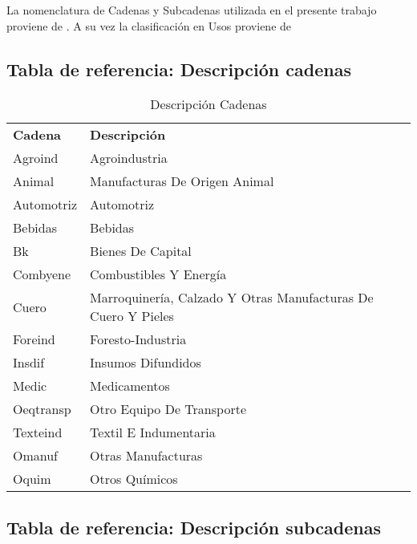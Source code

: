 \documentclass[class=article, crop=false]{standalone}
\begin{document}
La nomenclatura de Cadenas y Subcadenas utilizada en el presente trabajo proviene de \cite{molinari2016especializacion}. A su vez la clasificación en Usos proviene de \cite{flores2008world}
	
\subsection{Tabla de referencia: Descripción cadenas}



\begin{table}[!ht]
	\begin{tabular}{ll}
		\textbf{Cadena} & \textbf{Descripción} \\
		Agroind & Agroindustria \\
		Animal & Manufacturas De Origen Animal \\
		Automotriz & Automotriz \\
		Bebidas & Bebidas \\
		Bk & Bienes De Capital \\
		Combyene & Combustibles Y Energía \\
		Cuero & Marroquinería, Calzado Y Otras Manufacturas De Cuero Y Pieles \\
		Foreind & Foresto-Industria \\
		Insdif & Insumos Difundidos \\
		Medic & Medicamentos \\
		Oeqtransp & Otro Equipo De Transporte \\
		Texteind & Textil E Indumentaria \\
		Omanuf & Otras Manufacturas \\
		Oquim & Otros Químicos
	\end{tabular}
\caption{Descripción Cadenas}
\label{table:cadenas}
\end{table}



\subsection{Tabla de referencia: Descripción subcadenas}
\end{document}
